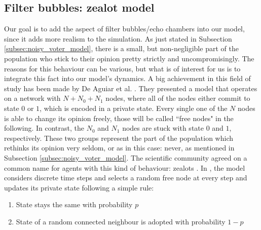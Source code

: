 \documentclass[12pt,a4paper,twoside]{article}
\begin{document}
\subsection{Filter bubbles: zealot model}
Our goal is to add the aspect of filter bubbles/echo chambers into our model, since it adds more realism to the simulation. As just stated in Subsection \ref{subsec:noisy_voter_model}, there is a small, but non-negligible part of the population who stick to their opinion pretty strictly and uncompromisingly. The reasons for this behaviour can be various, but what is of interest for us is to integrate this fact into our model's dynamics. A big achievement in this field of study has been made by De Aguiar et al. \cite{Aguiar2011, Chinellato2015, Braha2017}. They presented a model that operates on a network with $N + N_0 + N_1$ nodes, where all of the nodes either commit to state $0$ or $1$, which is encoded in a private state. Every single one of the $N$ nodes is able to change its opinion freely, those will be called ``free nodes" in the following. In contrast, the $N_0$ and $N_1$ nodes are stuck with state $0$ and $1$, respectively. These two groups represent the part of the population which rethinks its opinion very seldom, or as in this case: never, as mentioned in Subsection \ref{subsec:noisy_voter_model}. The scientific community agreed on a common name for agents with this kind of behaviour: zealots \cite{Mobilia2003, Chinellato2015, Braha2017}. In \cite{Chinellato2015}, the model considers discrete time steps and selects a random free node at every step and updates its private state following a simple rule:
\begin{enumerate}\label{rule:chinellato_update}
	\item State stays the same with probability $p$
	\item State of a random connected neighbour is adopted with probability $1-p$
\end{enumerate}
\end{document}
